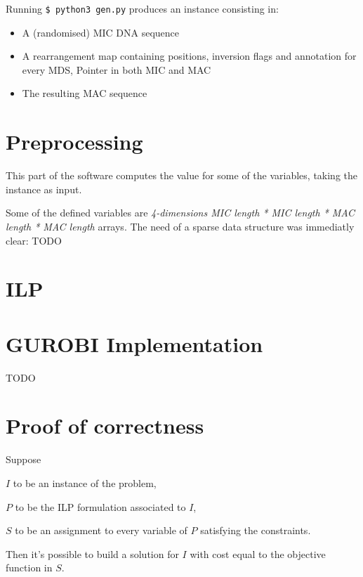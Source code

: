 Running \texttt{\$ python3 gen.py} produces an instance consisting in:

\begin{itemize}
	\item A (randomised) MIC DNA sequence
	\item A rearrangement map containing positions, inversion flags and annotation for every MDS, Pointer in both MIC and MAC
	\item The resulting MAC sequence
\end{itemize}

\section{Preprocessing}
This part of the software computes the value for some of the variables, taking the instance as input.

Some of the defined variables are \textit{4-dimensions MIC length * MIC length * MAC length * MAC length} arrays. The need of a sparse data structure was immediatly clear: TODO


\section{ILP}


\section{GUROBI Implementation}
TODO

\section{Proof of correctness}

\begin{lemma}
Suppose

$I$ to be an instance of the problem,

$P$ to be the ILP formulation associated to $I$,

$S$ to be an assignment to every variable of $P$ satisfying the constraints.

Then it's possible to build a solution for $I$ with cost equal to the objective function in $S$.
\end{lemma}